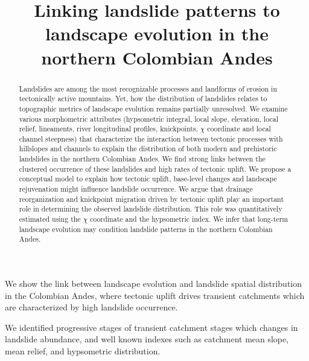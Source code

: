 \documentclass[draft]{agujournal2019}
\begin{document}
\title{Linking landslide patterns to landscape evolution in the northern Colombian Andes}




\begin{keypoints}
\item We show the link between landscape evolution and landslide spatial distribution in the Colombian Andes, where tectonic uplift drives transient catchments which are characterized by high landslide occurrence.
\item We identified progressive stages of transient catchment stages which changes in landslide abundance, and well known indexes such as catchment mean slope, mean relief, and hypsometric distribution.
\end{keypoints}

\begin{abstract}
Landslides are among the most recognizable processes and landforms of erosion in tectonically active mountains. Yet, how the distribution of landslides relates to topographic metrics of landscape evolution remains partially unresolved. We examine various morphometric attributes (hypsometric integral, local slope, elevation, local relief, lineaments, river longitudinal profiles, knickpoints, $\chi$ coordinate and local channel steepness) that characterize the interaction between tectonic processes with hillslopes and channels to explain the distribution of both modern and prehistoric landslides in the northern Colombian Andes. We find strong links between the clustered occurrence of these landslides and high rates of tectonic uplift. We propose a conceptual model to explain how tectonic uplift, base-level changes and landscape rejuvenation might influence landslide occurrence. We argue that drainage reorganization and knickpoint migration driven by tectonic uplift play an important role in determining the observed landslide distribution. This role was quantitatively estimated using the $\chi$ coordinate and the hypsometric index. We infer that long-term landscape evolution may condition landslide patterns in the northern Colombian Andes.
\end{abstract}
\end{document}
